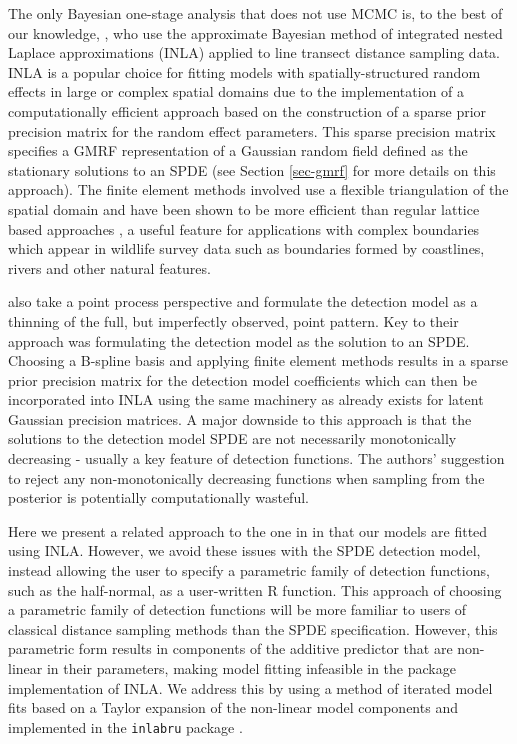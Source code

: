 \documentclass{stylefile16/statsoc}
\begin{document}
The only Bayesian one-stage analysis that does not use MCMC is, to the best of our knowledge, \citet{yuan_point_2017}, who use the approximate Bayesian method of integrated nested Laplace approximations (INLA) \citep{rue_approximate_2009} applied to line transect distance sampling data.  INLA is a popular choice for fitting models with spatially-structured random effects in large or complex spatial domains due to the implementation of a computationally efficient approach based on the construction of a sparse prior precision matrix for the random effect parameters.  This sparse precision matrix specifies a GMRF representation of a Gaussian random field defined as the stationary solutions to an SPDE \citep{lindgren_explicit_2011} (see Section \ref{sec-gmrf} for more details on this approach).  The finite element methods involved use a flexible triangulation of the spatial domain and have been shown to be more efficient than regular lattice based approaches \citep{simpson_going_2016}, a useful feature for applications with complex boundaries which appear in wildlife survey data such as boundaries formed by coastlines, rivers and other natural features.

\citet{yuan_point_2017} also take a point process perspective and formulate the detection model as a thinning of the full, but imperfectly observed, point pattern.  Key to their approach was formulating the detection model as the solution to an SPDE.  Choosing a B-spline basis and applying finite element methods results in a sparse prior precision matrix for the detection model coefficients which can then be incorporated into INLA using the same machinery as already exists for latent Gaussian precision matrices.  A major downside to this approach is that the solutions to the detection model SPDE are not necessarily monotonically decreasing - usually a key feature of detection functions.  The authors' suggestion to reject any non-monotonically decreasing functions when sampling from the posterior is potentially computationally wasteful.

Here we present a related approach to the one in \citet{yuan_point_2017} in that our models are fitted using INLA.  However, we avoid these issues with the SPDE detection model, instead allowing the user to specify a parametric family of detection functions, such as the half-normal, as a user-written R function.  This approach of choosing a parametric family of detection functions will be more familiar to users of classical distance sampling methods than the SPDE specification.  However, this parametric form results in components of the additive predictor that are non-linear in their parameters, making model fitting infeasible in the  \citep{rue_approximate_2009} package implementation of INLA.  We address this by using a method of iterated model fits based on a Taylor expansion of the non-linear model components and implemented in the \texttt{inlabru} package \citep{bachl_inlabru_2019}.
\end{document}
